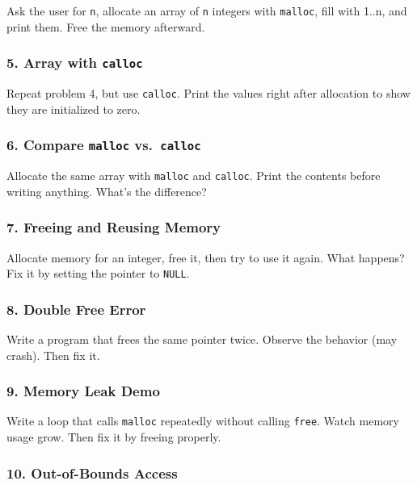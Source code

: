 \documentclass[
  letterpaper,
  DIV=11,
  numbers=noendperiod]{scrreprt}
\begin{document}
Ask the user for \texttt{n}, allocate an array of \texttt{n} integers
with \texttt{malloc}, fill with 1..n, and print them. Free the memory
afterward.

\subsubsection{\texorpdfstring{5. Array with
\texttt{calloc}}{5. Array with calloc}}\label{array-with-calloc}

Repeat problem 4, but use \texttt{calloc}. Print the values right after
allocation to show they are initialized to zero.

\subsubsection{\texorpdfstring{6. Compare \texttt{malloc}
vs.~\texttt{calloc}}{6. Compare malloc vs.~calloc}}\label{compare-malloc-vs.-calloc}

Allocate the same array with \texttt{malloc} and \texttt{calloc}. Print
the contents before writing anything. What's the difference?

\subsubsection{7. Freeing and Reusing
Memory}\label{freeing-and-reusing-memory}

Allocate memory for an integer, free it, then try to use it again. What
happens? Fix it by setting the pointer to \texttt{NULL}.

\subsubsection{8. Double Free Error}\label{double-free-error}

Write a program that frees the same pointer twice. Observe the behavior
(may crash). Then fix it.

\subsubsection{9. Memory Leak Demo}\label{memory-leak-demo}

Write a loop that calls \texttt{malloc} repeatedly without calling
\texttt{free}. Watch memory usage grow. Then fix it by freeing properly.

\subsubsection{10. Out-of-Bounds Access}\label{out-of-bounds-access-1}
\end{document}
